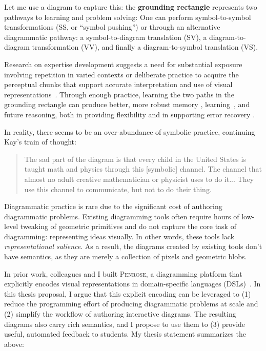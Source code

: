\documentclass[12pt]{cmuthesis}
\newcommand*{\Penrose}{\textsc{Penrose}\xspace}
\begin{document}
Let me use a diagram to capture this: the \textbf{grounding rectangle} represents two pathways to learning and problem solving: One can perform symbol-to-symbol transformations (SS, or “symbol pushing”) or through an \textcolor[HTML]{8C91C2}{alternative diagrammatic pathway}: a symbol-to-diagram translation (SV), a diagram-to-diagram transformation (VV), and finally a diagram-to-symbol translation (VS).

Research on expertise development suggests a need for substantial exposure involving repetition in varied contexts or deliberate practice \cite{deliberatePractice} to acquire the perceptual chunks \cite{chunkingModels, perceptualLearningExpertise} that support accurate interpretation and use of visual representations~\cite{Koedinger1990a}. Through enough practice, learning the two paths in the grounding rectangle can produce better, more robust memory \cite{dualCoding}, learning~\cite{multipleReps, multimediaLearning, cotraining}, and future reasoning, both in providing flexibility and in supporting error recovery \cite{groundedAndAbstractReps}.

In reality, there seems to be an over-abundance of symbolic practice, continuing Kay's train of thought:

\begin{quote}
    The sad part of the diagram is that every child in the United States is taught math and physics through this [symbolic] channel. The channel that almost no adult creative mathematician or physicist uses to do it... They use this channel to communicate, but not to do their thing.
\end{quote}

Diagrammatic practice is rare due to the significant cost of authoring diagrammatic problems. Existing diagramming tools often require hours of low-level tweaking of geometric primitives and do not capture the core task of diagramming: representing ideas visually. In other words, these tools lack \emph{representational salience}. As a result, the diagrams created by existing tools don't have semantics, as they are merely a collection of pixels and geometric blobs.  

In prior work, colleagues and I built \Penrose, a diagramming platform that explicitly encodes visual representations in domain-specific languages (DSLs)~\cite{penrose}. In this thesis proposal, I argue that this explicit encoding can be leveraged to (1) reduce the programming effort of producing diagrammatic problems at scale and (2) simplify the workflow of authoring interactive diagrams. The resulting diagrams also carry rich semantics, and I propose to use them to (3) provide useful, automated feedback to students. My thesis statement summarizes the above:
\end{document}
